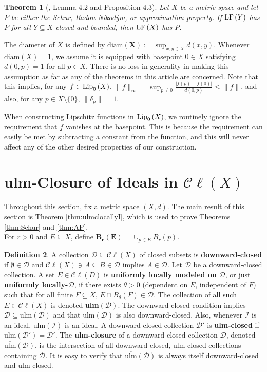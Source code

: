 \documentclass[12pt]{amsart}
\newtheorem{theorem}{Theorem}[section]
\theoremstyle{definition}
\newtheorem{definition}[theorem]{Definition}
\numberwithin{equation}{section}
\def \D {\mathcal{D}}
\def \I {\mathcal{I}}
\def \sbs {\subseteq}
\newcommand{\Cl}[1]{\mathcal{C}\ell\left(#1\right)}
\newcommand{\diam}[1]{\mathrm{diam}\left( #1 \right)}
\newcommand{\ulm}[1]{\mathrm{ulm}\left(#1\right)}
\newcommand{\ulmc}[1]{\overline{\mathrm{ulm}}\left(#1\right)}
\begin{document}
\begin{theorem}[\cite{K}, Lemma 4.2 and Proposition 4.3] \label{thm:Kalton}
Let $X$ be a metric space and let $P$ be either the Schur, Radon-Nikod\'ym, or approximation property. If $\LF{Y}$ has $P$ for all $Y \sbs X$ closed and bounded, then $\LF{X}$ has $P$.
\end{theorem}

The diameter of $X$ is defined by $\boldsymbol{\diam{X}} := \sup_{x,y \in X} d(x,y)$. Whenever $\diam{X} = 1$, we assume it is equipped with basepoint $0 \in X$ satisfying $d(0,p) = 1$ for all $p \in X$. There is no loss in generality in making this assumption as far as any of the theorems in this article are concerned. Note that this implies, for any $f \in \Lip{X}$, $\|f\|_\infty = \sup_{p \neq 0} \frac{|f(p)-f(0)|}{d(0,p)} \leq \|f\|$, and also, for any $p \in X \setminus \{0\}$, $\|\delta_p\| = 1$.

When constructing Lipschitz functions in $\Lip{X}$, we routinely ignore the requirement that $f$ vanishes at the basepoint. This is because the requirement can easily be met by subtracting a constant from the function, and this will never affect any of the other desired properties of our construction.

\section{ulm-Closure of Ideals in $\Cl{X}$} \label{sec:ideals}
Throughout this section, fix a metric space $(X,d)$. The main result of this section is Theorem \ref{thm:ulmclocallyI}, which is used to prove Theorems \ref{thm:Schur} and \ref{thm:AP}. \\

For $r > 0$ and $E \sbs X$, define $\boldsymbol{B_r(E)} = \cup_{p \in E} B_r(p)$.

\begin{definition} \label{def:ulm}
A collection $\D \sbs \Cl{X}$ of closed subsets is \textbf{downward-closed} if $\emptyset \in \D$ and $\Cl{X} \ni A \sbs B \in \D$ implies $A \in \D$. Let $\D$ be a downward-closed collection. A set $E \in \Cl{D}$ is \textbf{uniformly locally modeled on} $\boldsymbol{\D}$, or just \textbf{uniformly locally-}$\boldsymbol{\D}$, if there exists $\theta > 0$ (dependent on $E$, independent of $F$) such that for all finite $F \sbs X$, $E \cap B_\theta(F) \in \D$. The collection of all such $E \in \Cl{X}$ is denoted \textbf{ulm}$\boldsymbol{(\D)}$. The downward-closed condition implies $\D \sbs \ulm{\D}$ and that $\ulm{\D}$ is also downward-closed. Also, whenever $\I$ is an ideal, $\ulm{\I}$ is an ideal. A downward-closed collection $\D'$ is \textbf{ulm-closed} if $\ulm{\D'} = \D'$. The \textbf{ulm-closure} of a downward-closed collection $\D$, denoted $\boldsymbol{\ulmc{\D}}$, is the intersection of all downward-closed, ulm-closed collections containing $\D$. It is easy to verify that $\ulmc{\D}$ is always itself downward-closed and ulm-closed.
\end{definition}
\end{document}
